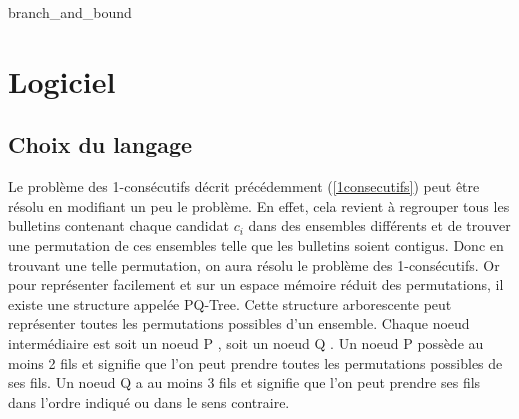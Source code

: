 \documentclass[11pt, a4paper]{article}
\begin{document}
\begin{algorithm}[H]
	\caption{branch\_and\_bound}
	
	\bigskip
\end{algorithm}

\section{Logiciel}

\subsection{Choix du langage}

Le problème des 1-consécutifs décrit précédemment (\ref{1consecutifs}) peut être résolu en modifiant un peu le problème. En effet, cela revient à regrouper tous les bulletins contenant chaque candidat $c_{i}$ dans des ensembles différents et de trouver une permutation de ces ensembles telle que les bulletins soient contigus. Donc en trouvant une telle permutation, on aura résolu le problème des 1-consécutifs. Or pour représenter facilement et sur un espace mémoire réduit des permutations, il existe une structure appelée PQ-Tree. Cette structure arborescente peut représenter toutes les permutations possibles d'un ensemble. Chaque noeud intermédiaire est soit un noeud \og P \fg{}, soit un noeud \og Q \fg{}. Un noeud P possède au moins 2 fils et signifie que l'on peut prendre toutes les permutations possibles de ses fils. Un noeud Q a au moins 3 fils et signifie que l'on peut prendre ses fils dans l'ordre indiqué ou dans le sens contraire.
\end{document}
